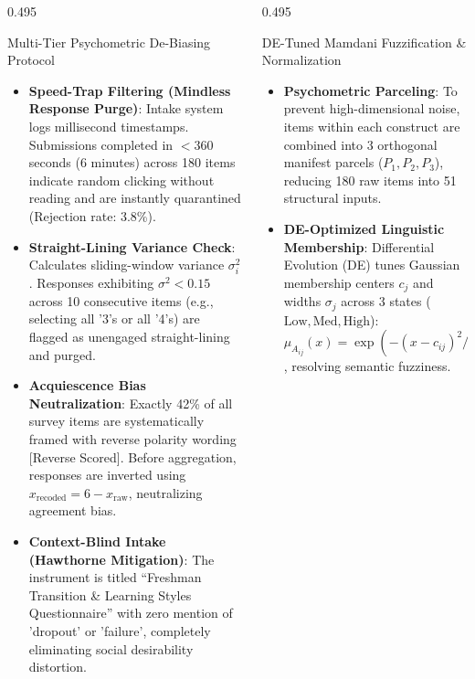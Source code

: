 \documentclass[aspectratio=169, 10pt]{beamer}
\newcommand{\leadbullet}[2]{\textbf{\color{NavyDark}#1}: \color{TextBody}#2}
\begin{document}
\begin{frame}
  \begin{columns}[T]
    \begin{column}{0.495\textwidth}
      \begin{defensecard}{Multi-Tier Psychometric De-Biasing Protocol}
        \fontsize{5.0pt}{6.2pt}\selectfont
        \begin{itemize}\setlength{\itemsep}{1.2pt}\setlength{\parskip}{0pt}
          \item \leadbullet{Speed-Trap Filtering (Mindless Response Purge)}{Intake system logs millisecond timestamps. Submissions completed in $< 360$ seconds (6 minutes) across 180 items indicate random clicking without reading and are instantly quarantined (Rejection rate: 3.8\%).}
          \item \leadbullet{Straight-Lining Variance Check}{Calculates sliding-window variance $\sigma_i^2$. Responses exhibiting $\sigma^2 < 0.15$ across 10 consecutive items (e.g., selecting all '3's or all '4's) are flagged as unengaged straight-lining and purged.}
          \item \leadbullet{Acquiescence Bias Neutralization}{Exactly 42\% of all survey items are systematically framed with reverse polarity wording [Reverse Scored]. Before aggregation, responses are inverted using $x_{\text{recoded}} = 6 - x_{\text{raw}}$, neutralizing agreement bias.}
          \item \leadbullet{Context-Blind Intake (Hawthorne Mitigation)}{The instrument is titled ``Freshman Transition \& Learning Styles Questionnaire'' with zero mention of 'dropout' or 'failure', completely eliminating social desirability distortion.}
        \end{itemize}
      \end{defensecard}
    \end{column}
    \begin{column}{0.495\textwidth}
      \begin{defensecard}{DE-Tuned Mamdani Fuzzification \& Normalization}
        \fontsize{5.0pt}{6.2pt}\selectfont
        \begin{itemize}\setlength{\itemsep}{1.2pt}\setlength{\parskip}{0pt}
          \item \leadbullet{Psychometric Parceling}{To prevent high-dimensional noise, items within each construct are combined into 3 orthogonal manifest parcels ($P_1, P_2, P_3$), reducing 180 raw items into 51 structural inputs.}
          \item \leadbullet{DE-Optimized Linguistic Membership}{Differential Evolution (DE) tunes Gaussian membership centers $c_j$ and widths $\sigma_j$ across 3 states ($\text{Low}, \text{Med}, \text{High}$): $\mu_{A_{ij}}(x) = \exp(-(x - c_{ij})^2 / (2\sigma_{ij}^2))$, resolving semantic fuzziness.}

\end{itemize}
\end{defensecard}
\end{column}
\end{columns}
\end{frame}
\end{document}
